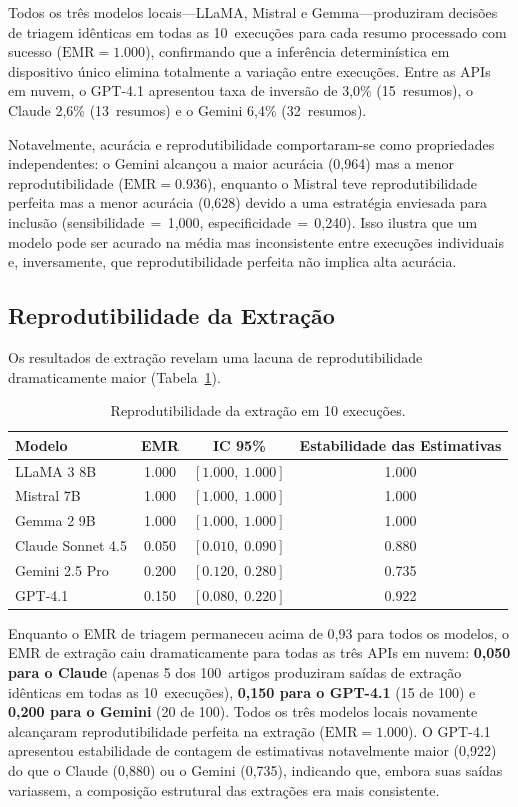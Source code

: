 \documentclass[12pt, a4paper]{article}
\newcommand{\emr}{\textrm{EMR}}
\newcommand{\ci}[2]{[#1,\;#2]}
\begin{document}
\noindent Todos os três modelos locais---LLaMA, Mistral e Gemma---produziram decisões de triagem idênticas em todas as 10~execuções para cada resumo processado com sucesso ($\emr{=}1.000$), confirmando que a inferência determinística em dispositivo único elimina totalmente a variação entre execuções.
Entre as APIs em nuvem, o GPT-4.1 apresentou taxa de inversão de 3,0\% (15~resumos), o Claude 2,6\% (13~resumos) e o Gemini 6,4\% (32~resumos).

Notavelmente, acurácia e reprodutibilidade comportaram-se como propriedades independentes: o Gemini alcançou a maior acurácia (0,964) mas a menor reprodutibilidade ($\emr{=}0.936$), enquanto o Mistral teve reprodutibilidade perfeita mas a menor acurácia (0,628) devido a uma estratégia enviesada para inclusão (sensibilidade$\,{=}\,$1,000, especificidade$\,{=}\,$0,240).
Isso ilustra que um modelo pode ser acurado na média mas inconsistente entre execuções individuais e, inversamente, que reprodutibilidade perfeita não implica alta acurácia.

\subsection{Reprodutibilidade da Extração}

Os resultados de extração revelam uma lacuna de reprodutibilidade dramaticamente maior (Tabela~\ref{tab:extraction}).

\begin{table}[H]
\centering
\caption{Reprodutibilidade da extração em 10 execuções.}
\label{tab:extraction}
\begin{tabular}{lccc}
\toprule
\textbf{Modelo} & \textbf{EMR} & \textbf{IC 95\%} & \textbf{Estabilidade das Estimativas} \\
\midrule
LLaMA 3 8B       & 1.000 & $\ci{1.000}{1.000}$ & 1.000 \\
Mistral 7B        & 1.000 & $\ci{1.000}{1.000}$ & 1.000 \\
Gemma 2 9B        & 1.000 & $\ci{1.000}{1.000}$ & 1.000 \\
\midrule
Claude Sonnet 4.5 & 0.050 & $\ci{0.010}{0.090}$ & 0.880 \\
Gemini 2.5 Pro    & 0.200 & $\ci{0.120}{0.280}$ & 0.735 \\
GPT-4.1           & 0.150 & $\ci{0.080}{0.220}$ & 0.922 \\
\bottomrule
\end{tabular}
\end{table}

\noindent Enquanto o EMR de triagem permaneceu acima de 0,93 para todos os modelos, o EMR de extração caiu dramaticamente para todas as três APIs em nuvem: \textbf{0,050 para o Claude} (apenas 5 dos 100~artigos produziram saídas de extração idênticas em todas as 10~execuções), \textbf{0,150 para o GPT-4.1} (15 de 100) e \textbf{0,200 para o Gemini} (20 de 100).
Todos os três modelos locais novamente alcançaram reprodutibilidade perfeita na extração ($\emr{=}1.000$).
O GPT-4.1 apresentou estabilidade de contagem de estimativas notavelmente maior (0,922) do que o Claude (0,880) ou o Gemini (0,735), indicando que, embora suas saídas variassem, a composição estrutural das extrações era mais consistente.
\end{document}

